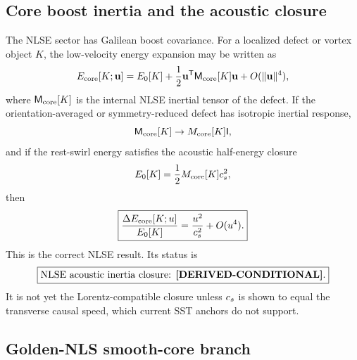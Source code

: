 \subsection{Core boost inertia and the acoustic closure}
\label{subsec:ctim-core-boost}

The NLSE sector has Galilean boost covariance.  For a localized defect or vortex object \(K\), the low-velocity energy expansion may be written as
\begin{equation}
    E_{\mathrm{core}}[K;\mathbf u]
    =
    E_0[K]
    +
    \frac12\mathbf u^{\mathsf T}
    \mathsf M_{\mathrm{core}}[K]
    \mathbf u
    +
    O(\lVert\mathbf u\rVert^4),
    \label{eq:ctim-core-boost-expansion}
\end{equation}
where \(\mathsf M_{\mathrm{core}}[K]\) is the internal NLSE inertial tensor of the defect.  If the orientation-averaged or symmetry-reduced defect has isotropic inertial response,
\begin{equation}
    \mathsf M_{\mathrm{core}}[K]\to M_{\mathrm{core}}[K]\mathsf I,
\end{equation}
and if the rest-swirl energy satisfies the acoustic half-energy closure
\begin{equation}
    E_0[K]
    =
    \frac12M_{\mathrm{core}}[K]c_s^2,
    \label{eq:ctim-acoustic-half-closure}
\end{equation}
then
\begin{equation}
    \boxed{
    \frac{\Delta E_{\mathrm{core}}[K;u]}{E_0[K]}
    =
    \frac{u^2}{c_s^2}
    +O(u^4).
    }
    \label{eq:ctim-core-ratio}
\end{equation}
This is the correct NLSE result.  Its status is
\begin{equation}
    \boxed{\text{NLSE acoustic inertia closure: }\textbf{[DERIVED-CONDITIONAL]}.}
\end{equation}
It is not yet the Lorentz-compatible closure unless \(c_s\) is shown to equal the transverse causal speed, which current SST anchors do not support.

\subsection{Golden-NLS smooth-core branch}
\label{subsec:ctim-golden-core}

